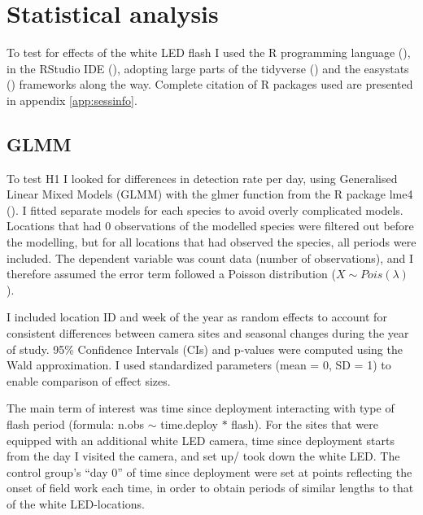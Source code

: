 

\section{Statistical analysis} %

To test for effects of the white LED flash I used the R programming language (\cite{RCoreTeam2020}), in the RStudio IDE (\cite{RStudioTeam2020a}), adopting large parts of the tidyverse (\cite{tidyverse}) and the easystats (\cite{easystats}) frameworks along the way. Complete citation of R packages used are presented in appendix \ref{app:sessinfo}. 


	\subsection*{GLMM}
To test H1 I looked for differences in detection rate per day, using Generalised Linear Mixed Models (GLMM) with the glmer function from the R package lme4 (\cite{lme4}).
I fitted separate models for each species to avoid overly complicated models. 
Locations that had 0 observations of the modelled species were filtered out before the modelling, but for all locations that had observed the species, all periods were included.
The dependent variable was count data (number of observations), and I therefore assumed the error term followed a Poisson distribution ($ X \sim Pois(\lambda) $).

I included location ID and week of the year as random effects to account for consistent differences between camera sites and seasonal changes during the year of study.
95\% Confidence Intervals (CIs) and p-values were computed using the Wald approximation.
I used standardized parameters (mean = 0, SD = 1) to enable comparison of effect sizes.

The main term of interest was time since deployment interacting with type of flash period (formula: n.obs $\sim$ time.deploy $\ast$ flash).
For the sites that were equipped with an additional white LED camera, time since deployment starts from the day I visited the camera, and set up/ took down the white LED.
The control group’s “day 0” of time since deployment were set at points reflecting the onset of field work each time, in order to obtain periods of similar lengths to that of the white LED-locations.

